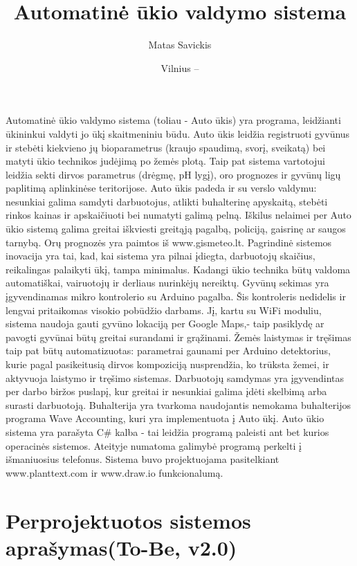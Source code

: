 \documentclass[oneside]{VUMIFPSkursinis}
\title{Automatinė ūkio valdymo sistema}
\author{Matas Savickis}
\date{Vilnius – \the\year}
\begin{document}
\setlength{\parindent}{4em}

\maketitle

\tableofcontents


Automatinė ūkio valdymo sistema (toliau - Auto ūkis) yra programa, leidžianti ūkininkui valdyti jo ūkį skaitmeniniu būdu. Auto ūkis leidžia registruoti gyvūnus ir stebėti kiekvieno jų bioparametrus (kraujo spaudimą, svorį, sveikatą) bei matyti ūkio technikos judėjimą po žemės plotą. Taip pat sistema vartotojui leidžia sekti dirvos parametrus (drėgmę, pH lygį), oro prognozes ir gyvūnų ligų paplitimą aplinkinėse teritorijose. Auto ūkis padeda ir su verslo valdymu: nesunkiai galima samdyti darbuotojus, atlikti buhalterinę apyskaitą, stebėti rinkos kainas ir apskaičiuoti bei numatyti galimą pelną. Iškilus nelaimei per Auto ūkio sistemą galima greitai iškviesti greitąją pagalbą, policiją, gaisrinę ar saugos tarnybą. Orų prognozės yra paimtos iš www.gismeteo.lt. Pagrindinė sistemos inovacija yra tai, kad, kai sistema yra pilnai įdiegta, darbuotojų skaičius, reikalingas palaikyti ūkį, tampa minimalus. Kadangi ūkio technika būtų valdoma automatiškai, vairuotojų ir derliaus nurinkėjų nereiktų. Gyvūnų sekimas yra įgyvendinamas mikro kontrolerio su Arduino pagalba. Šis kontroleris nedidelis ir lengvai pritaikomas visokio pobūdžio darbams. Jį, kartu su WiFi moduliu, sistema naudoja gauti gyvūno lokaciją per Google Maps,- taip pasiklydę ar pavogti gyvūnai būtų greitai surandami ir grąžinami. Žemės laistymas ir tręšimas taip pat būtų automatizuotas: parametrai gaunami per Arduino detektorius, kurie pagal pasikeitusią dirvos kompoziciją nusprendžia, ko trūksta žemei, ir aktyvuoja laistymo ir tręšimo sistemas. Darbuotojų samdymas yra įgyvendintas per darbo biržos puslapį, kur greitai ir nesunkiai galima įdėti skelbimą arba surasti darbuotoją. Buhalterija yra tvarkoma naudojantis nemokama buhalterijos programa Wave Accounting, kuri yra implementuota į Auto ūkį.  Auto ūkio sistema yra parašyta C\# kalba - tai leidžia programą paleisti ant bet kurios operacinės sistemos. Ateityje numatoma galimybė programą perkelti į išmaniuosius telefonus. Sistema buvo projektuojama pasitelkiant www.planttext.com ir www.draw.io funkcionalumą.
\pagebreak

\section{Perprojektuotos sistemos aprašymas(To-Be, v2.0)}
\end{document}
